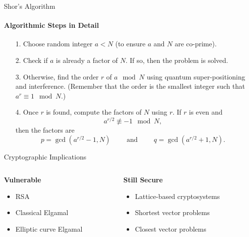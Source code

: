 \documentclass{beamer}
\begin{document}
\begin{frame}{Shor's Algorithm}
	\framesubtitle{Algorithmic Steps in Detail}
	\begin{itemize}
		\item[1.] Choose random integer \(a < N\) (to ensure \(a\) and \(N\) are co-prime).
		\pause
		\item[2.] Check if \(a\) is already a factor of \(N\). If so, then the problem is solved.
		\pause
		\item[3.] Otherwise, find the order \(r\) of \(a \mod N\) using quantum super-positioning and interference. (Remember that the order is the smallest integer such that \(a^r \equiv 1 \mod N\).)
		\pause
		\item[4.] Once \(r\) is found, compute the factors of \(N\) using \(r\). If \(r\) is even and 
		\[
			a^{r/2} \not\equiv -1 \mod N,
		\] 
		then the factors are 
		\[
			p = \gcd(a^{r/2} - 1, N) \qquad \text{ and } \qquad q = \gcd(a^{r/2} + 1, N).
		\] 
	\end{itemize}
	
\end{frame}




\begin{frame}{Cryptographic Implications}
    \begin{columns}
        \begin{column}{0.5\textwidth}
            \textbf{Vulnerable}
            \begin{itemize}
                \item RSA
                \item Classical Elgamal
                \item Elliptic curve Elgamal
            \end{itemize}
        \end{column}
		\pause
        \begin{column}{0.5\textwidth}
            \textbf{Still Secure}
            \begin{itemize}
                \item Lattice-based cryptosystems
                \item Shortest vector problems
                \item Closest vector problems
            \end{itemize}
        \end{column}
    \end{columns}
\end{frame}
\end{document}
